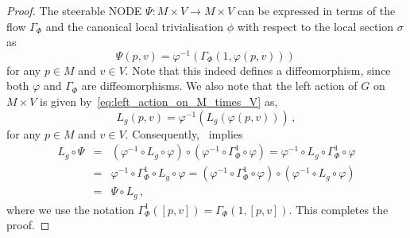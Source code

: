 \documentclass[10pt,a4paper]{amsart}
\begin{document}
\begin{proof}
    The steerable NODE $\Psi: M \times V \to M \times V$ can be expressed in terms of the flow $\Gamma_{\Phi}$ and the canonical local trivialisation $\phi$ with respect to the local section $\sigma$ as
    \begin{equation}
        \Psi(p,v) = \varphi^{-1} \left( \Gamma_{\Phi} (1,\varphi(p,v)) \right)\,
    \end{equation}
    for any $p \in M$ and $v \in V$. Note that this indeed defines a diffeomorphism, since both $\varphi$ and $\Gamma_{\Phi}$ are diffeomorphisms. We also note that the left action of $G$ on $M \times V$ is given by~\eqref{eq:left_action_on_M_times_V} as,
    \begin{equation}
        L_g(p,v) = \varphi^{-1} \left( L_g ( \varphi(p,v)) \right)\,,
    \end{equation}
    for any $p \in M$ and $v \in V$. Consequently,~ implies
    \begin{eqnarray*}
        L_g \circ \Psi &=& \left(\varphi^{-1} \circ L_g \circ \varphi \right) \circ \left( \varphi^{-1} \circ \Gamma^1_{\Phi} \circ \varphi \right) = \varphi^{-1} \circ L_g \circ \Gamma^1_{\Phi} \circ \varphi \\
        &=& \varphi^{-1} \circ \Gamma^1_{\Phi} \circ L_g \circ \varphi = \left(\varphi^{-1} \circ \Gamma^1_{\Phi} \circ \varphi \right) \circ \left( \varphi^{-1} \circ L_g \circ \varphi \right) \\
        &=& \Psi \circ L_g\,,
    \end{eqnarray*}
    where we use the notation $\Gamma^1_{\Phi}([p,v]) = \Gamma_{\Phi}(1,[p,v])$. This completes the proof.
\end{proof}
\end{document}
